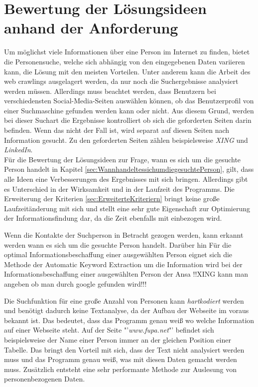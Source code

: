 

\chapter{Bewertung der Lösungsideen anhand der Anforderung}  %
\label{cha:Auswahl der Lösung anhand Anforderungen} %
Um möglichst viele Informationen über eine Person im Internet zu finden, bietet die Personensuche, welche sich abhängig von den eingegebenen Daten variieren kann, die Lösung mit den meisten Vorteilen. Unter anderem kann die Arbeit des web crawlings ausgelagert werden, da nur noch die Suchergebnisse analysiert werden müssen. Allerdings muss beachtet werden, dass Benutzern bei verschiedensten Social-Media-Seiten auswählen können, ob das Benutzerprofil von einer Suchmaschine gefunden werden kann oder nicht. Aus diesem Grund, werden bei dieser Suchart die Ergebnisse kontrolliert ob sich die geforderten Seiten darin befinden. Wenn das nicht der Fall ist, wird separat auf diesen Seiten nach Information gesucht. Zu den geforderten Seiten zählen beispielsweise \textit{XING} und \textit{LinkedIn}.\\
Für die Bewertung der Lösungsideen zur Frage, wann es sich um die gesuchte Person handelt in Kapitel \ref{sec:WannhandeltessichumdiegesuchtePerson}, gilt, dass alle Ideen eine Verbesserungen des Ergebnisses mit sich bringen. Allerdings gibt es Unterschied in der Wirksamkeit und in der Laufzeit des Programms. Die Erweiterung der Kriterien \ref{sec:ErweiterteKriteriern} bringt keine große Laufzeitänderung mit sich und stellt eine sehr gute Eigenschaft zur Optimierung der Informationsfindung dar, da die Zeit ebenfalls mit einbezogen wird.

Wenn die Kontakte der Suchperson in Betracht gezogen werden, kann erkannt werden wann es sich um die gesuchte Person handelt. Darüber hin
Für die optimal Informationsbeschaffung einer ausgewählten Person eignet sich die Methode der Automatic Keyword Extraction um die Information wird bei der Informationsbeschaffung einer ausgewählten Person der Ansa
!!XING kann man angeben ob man durch google gefunden wird!!!

Die Suchfunktion für eine große Anzahl von Personen kann \textit{hartkodiert} werden und benötigt dadurch keine Textanalyse, da der Aufbau der Webseite im voraus bekannt ist. Das bedeutet, dass das Programm genau weiß wo welche Information auf einer Webseite steht. Auf der Seite "'\textit{www.fupa.net}"' befindet sich beispielsweise der Name einer Person immer an der gleichen Position einer Tabelle. Das bringt den Vorteil mit sich, dass der Text nicht analysiert werden muss und das Programm genau weiß, was mit diesen Daten gemacht werden muss. Zusätzlich entsteht eine sehr performante Methode zur Auslesung von personenbezogenen Daten.

